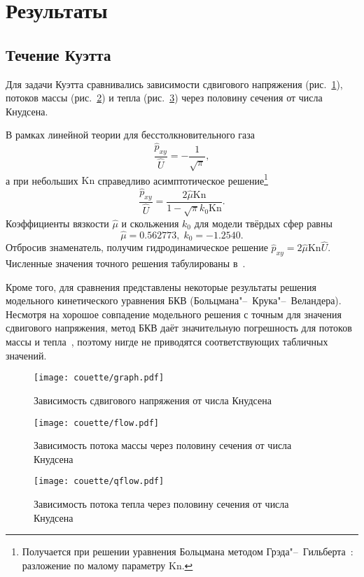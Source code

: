 \documentclass[english,russian,a4paper,12pt]{article}
\newcommand{\Kn}{\mathrm{Kn}}
\begin{document}
\section{Результаты}

\subsection{Течение Куэтта}

Для задачи Куэтта сравнивались зависимости сдвигового напряжения (рис.~\ref{fig:couette:shear}),
потоков массы (рис.~\ref{fig:couette:flow}) и тепла (рис.~\ref{fig:couette:qflow})
через половину сечения от числа Кнудсена.

В рамках линейной теории для бесстолкновительного газа
\[ \frac{\hat{p}_{xy}}{\hat{U}} = -\frac1{\sqrt{\pi}}, \]
а при небольших \(\Kn\) справедливо асимптотическое решение\footnote
{ Получается при решении уравнения Больцмана методом Грэда"--~Гильберта~\cite{sone2007}: разложение по малому параметру \(\Kn\). }
\[ \frac{\hat{p}_{xy}}{\hat{U}} = \frac{2\hat{\mu}\Kn}{1-\sqrt{\pi}k_0\Kn}. \]
Коэффициенты вязкости \(\hat{\mu}\) и скольжения \(k_0\) для модели твёрдых сфер равны~\cite{sone2007}
\[ \hat{\mu} = 0.562773, \; k_0 = -1.2540. \]
Отбросив знаменатель, получим гидродинамическое решение \(\hat{p}_{xy} = 2\hat{\mu}\Kn\hat{U}\).
Численные значения точного решения табулированы в~\cite{sone1990}.

Кроме того, для сравнения представлены некоторые результаты
решения модельного кинетического уравнения БКВ (Больцмана"--~Крука"--~Веландера).
Несмотря на хорошое совпадение модельного решения с точным для значения сдвигового напряжения,
метод БКВ даёт значительную погрешность для потоков массы и тепла~\cite{sone1990},
поэтому нигде не приводятся соответствующих табличных значений.

\begin{figure}
    \centering
    \texttt{[image: couette/graph.pdf]}
    \caption{Зависимость сдвигового напряжения от числа Кнудсена}\label{fig:couette:shear}
\end{figure}

\begin{figure}
    \centering
    \texttt{[image: couette/flow.pdf]}
    \caption{Зависимость потока массы через половину сечения от числа Кнудсена}\label{fig:couette:flow}
\end{figure}

\begin{figure}
    \centering
    \texttt{[image: couette/qflow.pdf]}
    \caption{Зависимость потока тепла через половину сечения от числа Кнудсена}\label{fig:couette:qflow}
\end{figure}
\end{document}

